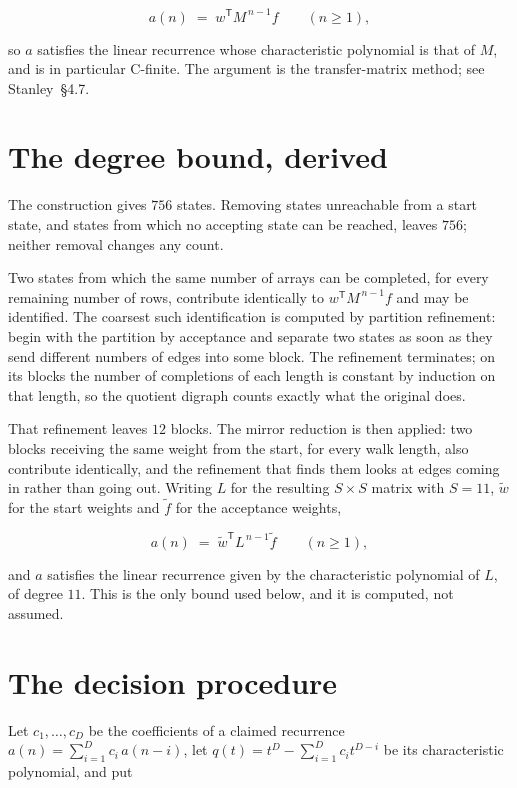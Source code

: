 \documentclass[11pt]{article}
\theoremstyle{definition}
\begin{document}
\[a(n) \;=\; w^{\mathsf T} M^{\,n-1} f \qquad (n \ge 1),\]

so $a$ satisfies the linear recurrence whose characteristic polynomial is that of $M$, and is in particular C-finite. The argument is the transfer-matrix method; see Stanley~\S4.7.

\section{The degree bound, derived}

The construction gives $756$ states. Removing states unreachable from a start state, and states from which no accepting state can be reached, leaves $756$; neither removal changes any count.

Two states from which the same number of arrays can be completed, for every remaining number of rows, contribute identically to $w^{\mathsf T}M^{\,n-1}f$ and may be identified. The coarsest such identification is computed by partition refinement: begin with the partition by acceptance and separate two states as soon as they send different numbers of edges into some block. The refinement terminates; on its blocks the number of completions of each length is constant by induction on that length, so the quotient digraph counts exactly what the original does.

That refinement leaves $12$ blocks. The mirror reduction is then applied: two blocks receiving the same weight from the start, for every walk length, also contribute identically, and the refinement that finds them looks at edges coming in rather than going out. Writing $L$ for the resulting $S \times S$ matrix with $S = 11$, $\tilde w$ for the start weights and $\tilde f$ for the acceptance weights,

\[a(n) \;=\; \tilde w^{\mathsf T} L^{\,n-1} \tilde f \qquad (n \ge 1),\]

and $a$ satisfies the linear recurrence given by the characteristic polynomial of $L$, of degree $11$. This is the only bound used below, and it is computed, not assumed.

\section{The decision procedure}

Let $c_1,\dots,c_D$ be the coefficients of a claimed recurrence $a(n) = \sum_{i=1}^{D} c_i\,a(n-i)$, let $q(t) = t^{D} - \sum_{i=1}^{D} c_i t^{D-i}$ be its characteristic polynomial, and put
\end{document}
